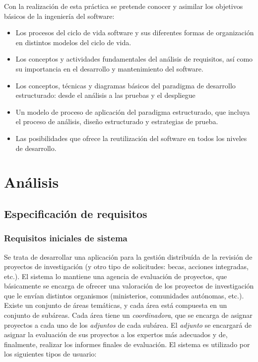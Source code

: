 \documentclass[12pt,a4paper,titlepage,spanish,twoside]{book}
\begin{document}
Con la realización de esta práctica se pretende conocer y asimilar los
objetivos básicos de la ingeniería del software: 
\begin{itemize}
\item Los procesos del ciclo de vida software y sus diferentes formas de
  organización en distintos modelos del ciclo de vida.
\item Los conceptos y actividades fundamentales del análisis de requisitos,
  así como su importancia en el desarrollo y mantenimiento del software.
\item Los conceptos, técnicas y diagramas básicos del paradigma de desarrollo
  estructurado: desde el análisis a las pruebas y el despliegue
\item Un modelo de proceso de aplicación del paradigma estructurado, que
  incluya el proceso de análisis, diseño estructurado y estrategias de prueba.
\item Las posibilidades que ofrece la reutilización del software en todos los
  niveles de desarrollo.
\end{itemize}

\part{Análisis}
\chapter{Especificación de requisitos}
\section{Requisitos iniciales de sistema}
Se trata de desarrollar una aplicación para la gestión distribuída de la
revisión de proyectos de investigación (y otro tipo de solicitudes:
becas, acciones integradas, etc.). El sistema lo mantiene una agencia de
evaluación de proyectos, que básicamente se encarga de ofrecer una valoración
de los proyectos de investigación que le envían distintos organismos
(ministerios, comunidades autónomas, etc.). Existe un conjunto de áreas
temáticas, y cada área está compuesta en un conjunto de subáreas. Cada
área tiene un \emph{coordinadora}, que se encarga de asignar proyectos
a cada uno de los \emph{adjuntos} de cada subárea. El \emph{adjunto} se
encargará de
asignar la evaluación de sus proyectos a los expertos más adecuados y de,
finalmente, realizar los informes finales de evaluación. El sistema es
utilizado por los siguientes tipos de usuario: 
\end{document}
